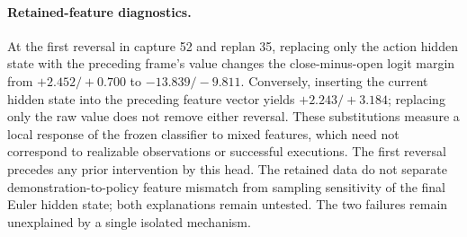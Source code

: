 \paragraph{Retained-feature diagnostics.}
At the first reversal in capture 52 and replan 35, replacing only the
action hidden state with the preceding frame's value changes the
close-minus-open logit margin from $+2.452/+0.700$ to $-13.839/-9.811$.
Conversely, inserting the current hidden state into the preceding feature
vector yields $+2.243/+3.184$; replacing only the raw value does not remove
either reversal. These substitutions measure a local response of the
frozen classifier to mixed features, which need not correspond to
realizable observations or successful executions. The first reversal
precedes any prior intervention by this head. The retained data do not
separate demonstration-to-policy feature mismatch from sampling
sensitivity of the final Euler hidden state; both explanations remain
untested. The two failures remain unexplained by a single isolated mechanism.
